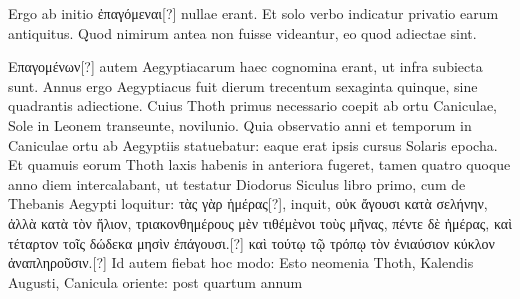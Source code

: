 Ergo ab initio \textgreek{ἐπαγόμεναι}[?]
nullae erant.
Et solo
verbo indicatur privatio earum
antiquitus.
Quod nimirum antea
non fuisse videantur, eo
quod adiectae sint.
%
%
\begin{table}[h]
  
\end{table}
\textgreek{Επαγομένων}[?]
autem Aegyptiacarum haec cognomina erant, ut infra subiecta sunt.
Annus ergo Aegyptiacus fuit dierum trecentum sexaginta quinque,
sine quadrantis adiectione.
Cuius Thoth primus necessario coepit ab
ortu Caniculae, Sole in Leonem transeunte, novilunio.
Quia
observatio anni et temporum in Caniculae ortu ab Aegyptiis statuebatur:
eaque erat ipsis cursus Solaris epocha.
Et quamuis eorum Thoth
laxis habenis in anteriora fugeret, tamen quatro quoque anno diem
intercalabant, ut testatur Diodorus Siculus libro primo, cum de
Thebanis Aegypti loquitur: \textgreek{τὰς γὰρ ἡμέρας}[?], inquit,
 \textgreek{οὐκ ἄγουσι κατὰ σελήνην,
ἀλλὰ κατὰ τὸν ἥλιον, τριακονθημέρους μὲν τιθέμὲνοι τοὺς μῆνας, πέντε
δὲ ἡμέρας, καὶ τέταρτον τοῖς δώδεκα μησὶν ἐπάγουσι.}[?]
\textgreek{καὶ τούτῳ τῷ τρόπῳ τὸν ἐνιαύσιον κύκλον ἀναπληροῦσιν.}[?]
Id autem fiebat hoc modo: Esto neomenia
Thoth, Kalendis Augusti, Canicula oriente: post quartum annum

